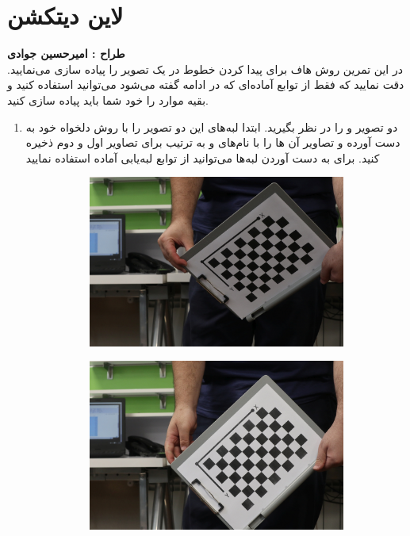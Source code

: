 \documentclass[a4paper]{article}
\begin{document}
\clearpage
\section{لاین دیتکشن}
\textbf{طراح :‌ امیرحسین جوادی}
\vspace{0.5cm}
\\
در این تمرین روش هاف 
 برای پیدا کردن خطوط در یک تصویر را پیاده سازی می‌نمایید. دقت نمایید که فقط از توابع آماده‌ای که در ادامه گفته می‌شود می‌توانید استفاده کنید و بقیه موارد را خود شما باید پیاده سازی کنید.
\begin{enumerate}
	\item 
دو تصویر
 و
	 را در نظر بگیرید. ابتدا لبه‌های این دو تصویر را با روش دلخواه خود به دست آورده و تصاویر آن ها را با نام‌های
	 و
	 به ترتیب برای تصاویر اول و دوم ذخیره کنید. برای به دست آوردن لبه‌ها می‌توانید از توابع لبه‌یابی آماده استفاده نمایید
	\begin{figure}[H]
		\centering
		\begin{subfigure}{.49\textwidth}
			\centering
			\includegraphics[width=.75\linewidth]{im01}
			\caption{}
		\end{subfigure}
		\begin{subfigure}{.49\textwidth}
			\centering
			\includegraphics[width=.75\linewidth]{im02}

\end{subfigure}
\end{figure}
\end{enumerate}
\end{document}
